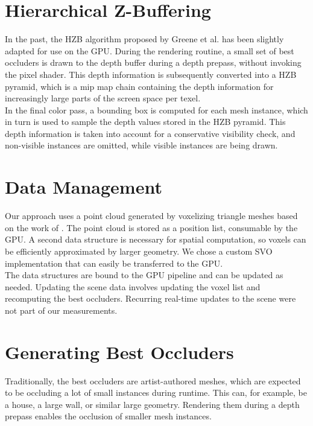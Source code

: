\documentclass[conference]{IEEEtran}
\begin{document}
\section{Hierarchical Z-Buffering} \label{sec-hierarchical-z-buffering}

\noindent
In the past, the \ac{HZB} algorithm proposed by Greene et al. \cite{b1} has been slightly 
adapted for use on the \ac{GPU}. During the rendering routine, a small set of best occluders is 
drawn to the depth buffer during a depth prepass, without invoking the pixel shader. This 
depth information is subsequently converted into a \ac{HZB} pyramid, which is a mip map chain 
containing the depth information for increasingly large parts of the screen space per texel. \\

\noindent
In the final color pass, a bounding box is computed for each mesh instance, which in turn is used 
to sample the depth values stored in the \ac{HZB} pyramid. This depth information is taken into 
account for a conservative visibility check, and non-visible instances are omitted, while visible 
instances are being drawn.

\section{Data Management} \label{sec-data-management}

\noindent
Our approach uses a point cloud generated by voxelizing triangle meshes based on the work of \cite{b5}. 
The point cloud is stored as a position list, consumable by the \ac{GPU}. A second data structure is 
necessary for spatial computation, so voxels can be efficiently approximated by larger geometry. 
We chose a custom \ac{SVO} implementation that can easily be transferred to the \ac{GPU}. \\

\noindent
The data structures are bound to the \ac{GPU} pipeline and can be updated as needed. Updating the scene data 
involves updating the voxel list and recomputing the best occluders. Recurring real-time updates to the 
scene were not part of our measurements.

\section{Generating Best Occluders} \label{sec-gen-best-occluders}

\noindent
Traditionally, the best occluders are artist-authored meshes, which are expected to be occluding a lot 
of small instances during runtime. This can, for example, be a house, a large wall, or similar large 
geometry. Rendering them during a depth prepass enables the occlusion of smaller mesh instances. \\
\end{document}
